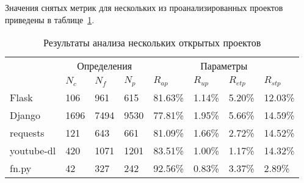 Значения снятых метрик для нескольких из проанализированных проектов приведены в
таблице~\ref{tab:statistic-results-1}.

\begin{table}[H]
  \small
  \caption{Результаты анализа нескольких открытых проектов}
  \label{tab:statistic-results-1}
  \begin{tabularx}{\textwidth}{ |X|X|X|X|X|X|X|X| }
    \hline
    \multicolumn{1}{|c|}{\multirow{2}{*}{}} &
    \multicolumn{3}{c|}{Определения} &
    \multicolumn{4}{c|}{Параметры}
    \\ \cline{2-8}
    & $N_c$ & $N_f$ & $N_p$ & $R_{ap}$ & $R_{up}$ & $R_{etp}$ & $R_{stp}$ 
    \\ \hline

    Flask & 106 & 961 & 615 & 81.63\% & 1.14\% & 5.20\% & 12.03\%
    \\ \hline

    Django & 1696 & 7494 & 9530 & 77.81\% & 1.95\% & 5.66\% & 14.59\%
    \\ \hline

    requests & 121 & 643 & 661 & 81.09\% & 1.66\% & 2.72\% & 14.52\%
    \\ \hline

    youtube-dl & 420 & 1071 & 1201 & 83.51\% & 1.00\% & 1.17\% & 14.32\%
    \\ \hline

    fn.py & 42 & 327 & 242 & 92.56\% & 0.83\% & 3.37\% & 2.89\%
    \\ \hline






  \end{tabularx}
\end{table}


